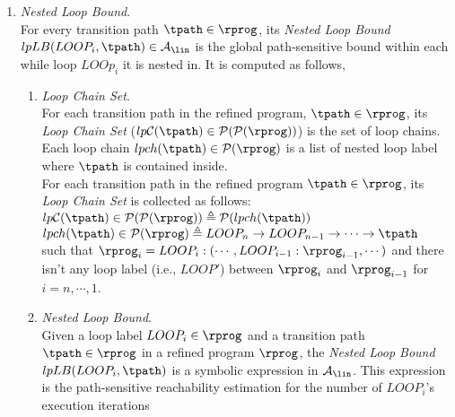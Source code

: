 \begin{enumerate}
%
\item \emph{Nested Loop Bound}.
\\
For every transition path $\tpath \in \rprog$, 
its \emph{Nested Loop Bound} $lpLB(LOOP_i, \tpath) \in \mathcal{A}_{\lin}$ is the global path-sensitive bound within each while loop $LOOp_i$ it is nested in.
It is computed as follows,
\begin{enumerate}
  \item \emph{Loop Chain Set}.
  \\
  For each transition path in the refined program, $\tpath \in \rprog$, its \emph{Loop Chain Set} ($lp\mathcal{C}(\tpath) \in \mathcal{P}(\mathcal{P}(\rprog))$) is the set of 
  loop chains. Each loop chain $lpch(\tpath) \in \mathcal{P}(\rprog)$ is a list of nested loop label where 
  $\tpath$ is contained inside.
  \\
For each transition path in the refined program $\tpath \in \rprog$, 
its \emph{Loop Chain Set} is collected as follows: 
\\
$lp\mathcal{C}(\tpath) \in \mathcal{P}(\mathcal{P}(\rprog)) \triangleq \mathcal{P}(lpch(\tpath))$
\\
$lpch(\tpath) \in \mathcal{P}(\rprog) \triangleq 
LOOP_n \to LOOP_{n-1} \to \cdots \to \tpath$
\\
such that 
$\rprog_{i}= LOOP_i : (\cdots, LOOP_{i - 1} : \rprog_{i-1}, \cdots)$ and
 there isn't any loop label (i.e., $LOOP'$) between $\rprog_{i}$ and $\rprog_{i - 1}$ for $i = n, \cdots, 1$.
\item  \emph{Nested Loop Bound}.
\\
Given a loop label $LOOP_i \in \rprog$ and a transition path $\tpath \in \rprog$ in a refined program $\rprog$,
the \emph{Nested Loop Bound} $lpLB(LOOP_i, \tpath)$ is a symbolic expression in $\mathcal{A}_{\lin}$.
This expression is the path-sensitive
reachability estimation for the number of $LOOP_i$'s execution iterations

\end{enumerate}
\end{enumerate}
